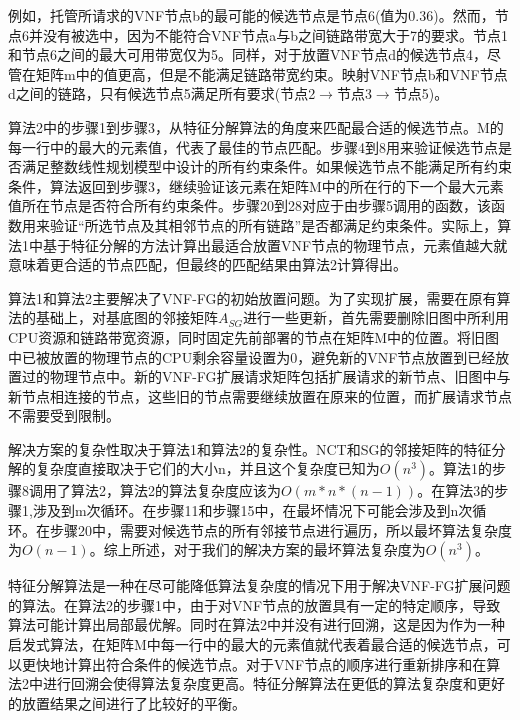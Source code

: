 例如，托管所请求的VNF节点b的最可能的候选节点是节点6(值为0.36)。然而，节点6并没有被选中，因为不能符合VNF节点a与b之间链路带宽大于7的要求。节点1和节点6之间的最大可用带宽仅为5。同样，对于放置VNF节点d的候选节点4，尽管在矩阵m中的值更高，但是不能满足链路带宽约束。映射VNF节点b和VNF节点d之间的链路，只有候选节点5满足所有要求(节点2$\rightarrow$节点3$\rightarrow$节点5)。\par
算法2中的步骤1到步骤3，从特征分解算法的角度来匹配最合适的候选节点。M的每一行中的最大的元素值，代表了最佳的节点匹配。步骤4到8用来验证候选节点是否满足整数线性规划模型中设计的所有约束条件。如果候选节点不能满足所有约束条件，算法返回到步骤3，继续验证该元素在矩阵M中的所在行的下一个最大元素值所在节点是否符合所有约束条件。步骤20到28对应于由步骤5调用的函数，该函数用来验证“所选节点及其相邻节点的所有链路”是否都满足约束条件。实际上，算法1中基于特征分解的方法计算出最适合放置VNF节点的物理节点，元素值越大就意味着更合适的节点匹配，但最终的匹配结果由算法2计算得出。\par
算法1和算法2主要解决了VNF-FG的初始放置问题。为了实现扩展，需要在原有算法的基础上，对基底图的邻接矩阵$A_{SG}$进行一些更新，首先需要删除旧图中所利用CPU资源和链路带宽资源，同时固定先前部署的节点在矩阵M中的位置。将旧图中已被放置的物理节点的CPU剩余容量设置为0，避免新的VNF节点放置到已经放置过的物理节点中。新的VNF-FG扩展请求矩阵包括扩展请求的新节点、旧图中与新节点相连接的节点，这些旧的节点需要继续放置在原来的位置，而扩展请求节点不需要受到限制。\par
解决方案的复杂性取决于算法1和算法2的复杂性。NCT和SG的邻接矩阵的特征分解的复杂度直接取决于它们的大小n，并且这个复杂度已知为$O(n^3)$。算法1的步骤8调用了算法2，算法2的算法复杂度应该为$O(m*n*(n-1))$。在算法3的步骤1,涉及到m次循环。在步骤11和步骤15中，在最坏情况下可能会涉及到n次循环。在步骤20中，需要对候选节点的所有邻接节点进行遍历，所以最坏算法复杂度为$O(n-1)$。综上所述，对于我们的解决方案的最坏算法复杂度为$O(n^3)$。\par
特征分解算法是一种在尽可能降低算法复杂度的情况下用于解决VNF-FG扩展问题的算法。在算法2的步骤1中，由于对VNF节点的放置具有一定的特定顺序，导致算法可能计算出局部最优解。同时在算法2中并没有进行回溯，这是因为作为一种启发式算法，在矩阵M中每一行中的最大的元素值就代表着最合适的候选节点，可以更快地计算出符合条件的候选节点。对于VNF节点的顺序进行重新排序和在算法2中进行回溯会使得算法复杂度更高。特征分解算法在更低的算法复杂度和更好的放置结果之间进行了比较好的平衡。\par
